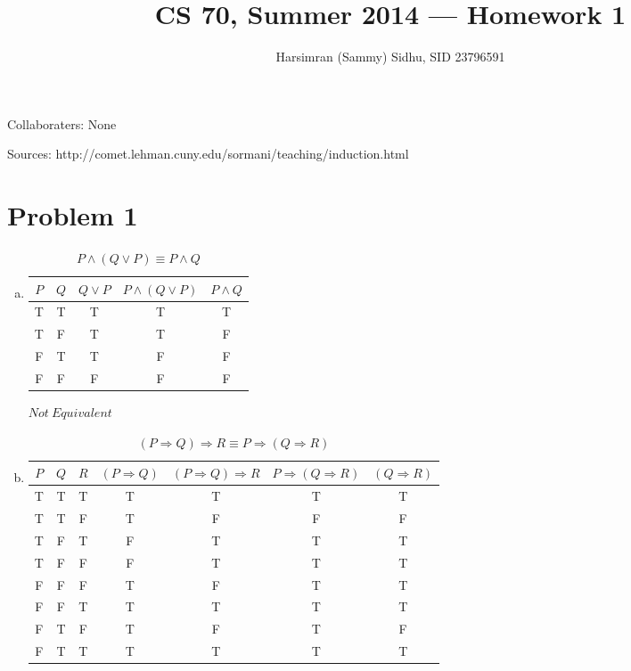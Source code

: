 \documentclass[11pt,letterpaper]{article}
\title{CS 70, Summer 2014 --- Homework 1} %
\author{Harsimran (Sammy) Sidhu, SID 23796591} %
\begin{document}
\maketitle

Collaboraters: None

Sources: http://comet.lehman.cuny.edu/sormani/teaching/induction.html

\section*{Problem 1} %

\begin{enumerate}[(a)]

\item
\begin{table}[h] 
\caption{$P\wedge (Q\vee P) \equiv P \wedge Q$} %
\centering %
\begin{tabular}{c c c c c} %
\hline %
$P$ & $Q$ & $Q\vee{P}$ & $P\wedge{(Q\vee P)}$ & $P\wedge Q$ \\ %
\hline %
T & T & T & T & T \\
T & F & T & T & F \\
F & T & T & F & F \\
F & F & F & F & F \\ %
\hline %
\end{tabular} 
\label{table:1a} %
\end{table}

$Not~Equivalent$


\item 

\begin{table}[h] 
\caption{$(P\Rightarrow Q)\Rightarrow R \equiv P\Rightarrow (Q\Rightarrow R)$} %
\centering %
\begin{tabular}{c c c c c c c} %
\hline %
$P$ & $Q$ & $R$ \vline & $(P\Rightarrow Q)$ \vline & $(P\Rightarrow Q)\Rightarrow R$ \vline & $P\Rightarrow (Q\Rightarrow R)$ \vline & $(Q\Rightarrow R)$ \\ %
\hline %
T & T & T & T & T & T & T\\
T & T & F & T & F & F & F\\
T & F & T & F & T & T & T\\
T & F & F & F & T & T & T\\
F & F & F & T & F & T & T\\
F & F & T & T & T & T & T\\
F & T & F & T & F & T & F\\
F & T & T & T & T & T & T\\
\hline %
\end{tabular} 
\label{table:1a} %
\end{table}


\end{enumerate}
\end{document}
